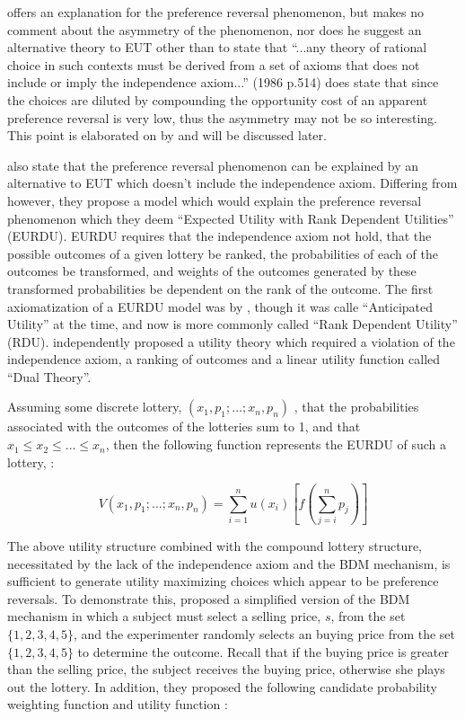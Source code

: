 \documentclass[../main.tex]{subfiles}
\begin{document}
\textcite{Holt1986} offers an explanation for the preference reversal phenomenon, but makes no comment about the asymmetry of the phenomenon, nor does he suggest an alternative theory to EUT other than to state that \enquote{...any theory of rational choice in such contexts must be derived from a set of axioms that does not include or imply the independence axiom...} (1986 p.514) \textcite{Holt1986} does state that since the choices are diluted by compounding the opportunity cost of an apparent preference reversal is very low, thus the asymmetry may not be so interesting.
This point is elaborated on by \textcite{Harrison1989, Harrison1992} and will be discussed later. 

\textcite{Karni1987} also state that the preference reversal phenomenon can be explained by an alternative to EUT which doesn't include the independence axiom.
Differing from \textcite{Holt1986} however, they propose a model which would explain the preference reversal phenomenon which they deem \enquote{Expected Utility with Rank Dependent Utilities} (EURDU).
EURDU requires that  the independence axiom not hold, that the possible outcomes of a given lottery be ranked, the probabilities of each of the outcomes be transformed, and weights of the outcomes generated by these transformed probabilities be dependent on the rank of the outcome.
The first axiomatization of a EURDU model was by \textcite{Quiggin1982}, though it was calle \enquote{Anticipated Utility} at the time, and now is more commonly called \enquote{Rank Dependent Utility} (RDU).
\textcite{Yaari1987} independently proposed a utility theory which required a violation of the independence axiom, a ranking of outcomes and a linear utility function called \enquote{Dual Theory}.

Assuming some discrete lottery, $(x_1,p_1;\ldots;x_n,p_n)$ , that the probabilities associated with the outcomes of the lotteries sum to 1, and that $x_1 \leq x_2 \leq \ldots \leq x_n$, then the following function represents the  EURDU of such a lottery, \textcite{Karni1987}:

\begin{equation}
	\label{eq:KS1987-EURDU}
	V(x_1,p_1; \ldots ; x_n, p_n) = \sum_{i=1}^{n}u(x_i) \left[ f\left( \sum_{j=i}^n p_j\right)  \right]
\end{equation}

The above utility structure combined with the compound lottery structure, necessitated by the lack of the independence axiom and the BDM mechanism, is sufficient to generate utility maximizing choices which appear to be preference reversals. To demonstrate this, \textcite{Karni1987} proposed a simplified version of the BDM mechanism in which a subject must select a selling price, $s$, from the set $\lbrace 1,2,3,4,5\rbrace$, and the experimenter randomly selects an buying price from the set $\lbrace 1,2,3,4,5 \rbrace$ to determine the outcome.
Recall that if the buying price is greater than the selling price, the subject receives the buying price, otherwise she plays out the lottery.
In addition, they proposed the following candidate probability weighting function and utility function :
\end{document}
